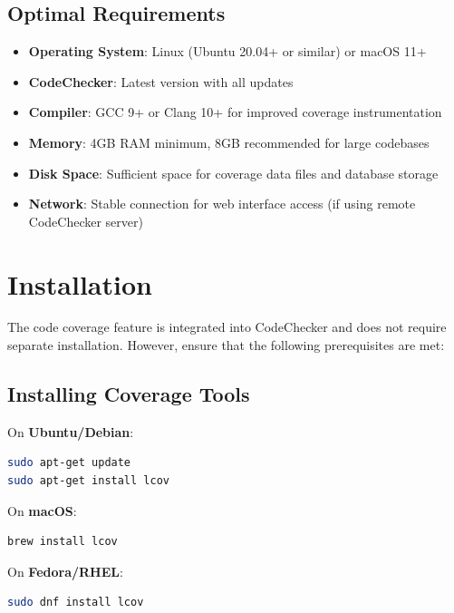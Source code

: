 \subsection{Optimal Requirements}

\begin{itemize}
    \item \textbf{Operating System}: Linux (Ubuntu 20.04+ or similar) or macOS 11+
    \item \textbf{CodeChecker}: Latest version with all updates
    \item \textbf{Compiler}: GCC 9+ or Clang 10+ for improved coverage instrumentation
    \item \textbf{Memory}: 4GB RAM minimum, 8GB recommended for large codebases
    \item \textbf{Disk Space}: Sufficient space for coverage data files and database storage
    \item \textbf{Network}: Stable connection for web interface access (if using remote CodeChecker server)
\end{itemize}

\section{Installation}

The code coverage feature is integrated into CodeChecker and does not require separate installation. However, ensure that the following prerequisites are met:

\subsection{Installing Coverage Tools}

On \textbf{Ubuntu/Debian}:
\begin{lstlisting}[language=bash, caption={Installing lcov on Ubuntu/Debian}]
sudo apt-get update
sudo apt-get install lcov
\end{lstlisting}

On \textbf{macOS}:
\begin{lstlisting}[language=bash, caption={Installing lcov on macOS}]
brew install lcov
\end{lstlisting}

On \textbf{Fedora/RHEL}:
\begin{lstlisting}[language=bash, caption={Installing lcov on Fedora/RHEL}]
sudo dnf install lcov
\end{lstlisting}

